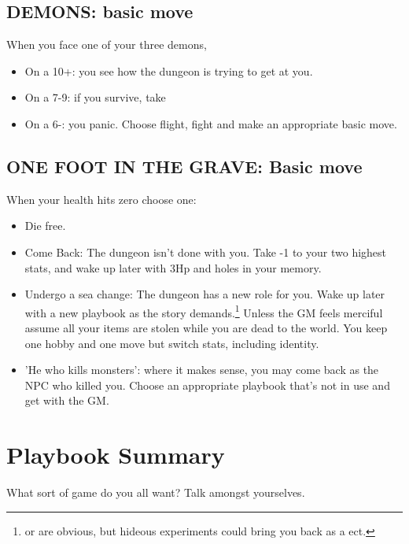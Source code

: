 \documentclass{tufte-book}
\begin{document}
\section{DEMONS: basic move}
When you face one of your three demons, 
\begin{itemize}
\item On a 10+: you see how the dungeon is trying to get at you. 
\item On a 7-9: if you survive, take 
\item On a 6-: you panic. Choose flight, fight and make an appropriate basic move.
\end{itemize}

\bigskip


\section{ONE FOOT IN THE GRAVE: Basic move}
When your health hits zero choose one:
\begin{itemize}
\item Die free.
\item Come Back: The dungeon isn't done with you. Take -1 to your two highest stats, and wake up later with 3Hp and holes in your memory.
\item Undergo a sea change: The dungeon has a new role for you. Wake up later with a new playbook as the story demands.\footnote{ or  are obvious, but hideous experiments could bring you back as a  ect.} Unless the GM feels merciful assume all your items are stolen while you are dead to the world. You keep one hobby and one move but switch stats, including identity. 
\item 'He who kills monsters': where it makes sense, you may come back as the NPC who killed you. Choose an appropriate playbook that's not in use and get with the GM.
\end{itemize}





\chapter{Playbook Summary}

What sort of game do you all want? Talk amongst yourselves.
\bigskip
\end{document}
